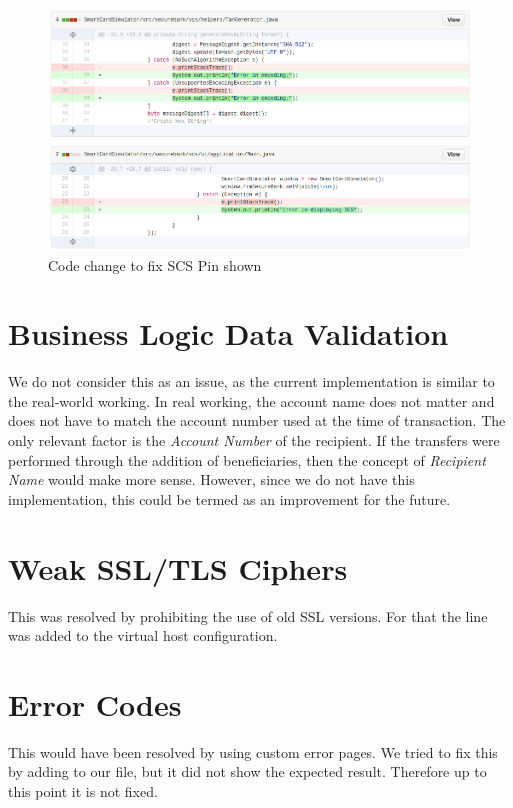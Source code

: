 \begin{figure}[ht]
	\centering
	\includegraphics[width=.8\linewidth]{figures/fix_scs_pin_shown.png}
	\caption{Code change to fix SCS Pin shown}
	\label{fig:fix_scs_pin_shown}
\end{figure}

\clearpage 

\section{Business Logic Data Validation}
We do not consider this as an issue, as the current implementation is similar to the real-world working. In real working, the account name does not matter and does not  have to match the account number used at the time of transaction. The only relevant factor is the \textit{Account Number} of the recipient.
If the transfers were performed through the addition of beneficiaries, then the concept of \textit{Recipient Name} would make more sense. However, since we do not have this implementation, this could be termed as an improvement for the future.

\section{Weak SSL/TLS Ciphers}
This was resolved by prohibiting the use of old SSL versions. For that the line  was added to the virtual host configuration.

\section{Error Codes}
This would have been resolved by using custom error pages. We tried to fix this by adding  to our  file, but it did not show the expected result. Therefore up to this point it is not fixed.

